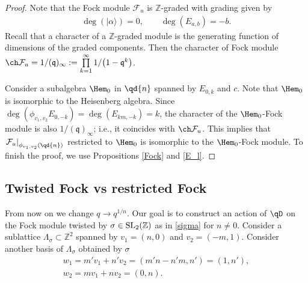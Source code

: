 \begin{proof}
Note that the Fock module $\mathcal{F}_u$ is $\mathbb{Z}$-graded with grading given by
\begin{gather*}
\deg(| \alpha \rangle) = 0, \qquad \deg (E_{a,b})=-b.
\end{gather*}
Recall that a character of a $\mathbb{Z}$-graded module is the generating function of dimensions of the graded components. Then the character of Fock module $\ch \mathcal{F}_u = 1/(\mathfrak{q})_{ \infty } := \prod\limits_{k=1}^{\infty} 1/\big(1-\mathfrak{q}^k\big)$.

Consider a subalgebra $\Hem_0$ in $\qd{n}$ spanned by $E_{0, k}$ and $c$. Note that $\Hem_0$ is isomorphic to the Heisenberg algebra. Since $\deg (\phi_{v_1,v_2}E_{0,-k} )= \deg (E_{km,-k}) = k$, the character of the $\Hem_0$-Fock module is also $1/(\mathfrak{q})_{\infty}$; i.e., it coincides with $\ch \mathcal{F}_u$. This implies that $\left. \mathcal{F}_u \right|_{\phi_{v_1, v_2} \left(\qd{n} \right)}$ restricted to $\Hem_0$ is isomorphic to the $\Hem_0$-Fock module. To finish the proof, we use Propositions \ref{Fock} and \ref{E_l}.
\end{proof}

\subsection{Twisted Fock vs restricted Fock}
From now on we change $q \rightarrow q^{1/n}$.
Our goal is to construct an action of $\qD$ on the Fock module twisted by $\sigma \in {\rm SL}_2 ( \mathbb{Z} )$ as in \eqref{sigma} for $n \neq 0$. Consider a sublattice $\Lambda_{\sigma} \subset \mathbb{Z}^2$ spanned by $v_1 = (n,0)$ and $v_2 = (-m, 1)$. Consider another basis of $\Lambda_{\sigma}$ obtained by $\sigma$
\begin{gather}
w_1= m' v_1 + n' v_2 = (m' n - n' m, n') = (1, n'), \label{eq: v to w change 1} \\
w_2= m v_1 + n v_2 = (0, n). \label{eq: v to w change 2}
\end{gather}


